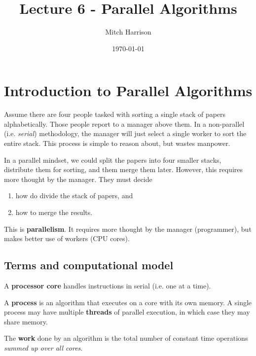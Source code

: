 \documentclass[titlepage, 12pt, leqno]{article}
\title{\Huge{Lecture 6 - Parallel Algorithms}}
\author{\large{Mitch Harrison}}
\date{\today}
\begin{document}
\setlength{\parskip}{1\baselineskip}
\setlength{\parindent}{15pt}
\maketitle
\tableofcontents
\newpage


\section{Introduction to Parallel Algorithms}

Assume there are four people tasked with sorting a single stack of papers
alphabetically. Those people report to a manager above them. In a non-parallel
(i.e. \textit{serial}) methodology, the manager will just select a single 
worker to sort the entire stack. This process is simple to reason about, but
wastes manpower.

In a parallel mindset, we could split the papers into four smaller stacks,
distribute them for sorting, and them merge them later. However, this requires
more thought by the manager. They must decide 
\begin{enumerate}
    \item how do divide the stack of papers, and
    \item how to merge the results.
\end{enumerate}

This is \textbf{parallelism}. It requires more thought by the manager
(programmer), but makes better use of workers (CPU cores).

\subsection{Terms and computational model}
\begin{definition}
    A \textbf{processor core} handles instructions in serial (i.e. one at a
    time).
\end{definition}

\begin{definition}
    A \textbf{process} is an algorithm that executes on a core with its own
    memory. A single process may have multiple \textbf{threads} of parallel
    execution, in which case they may share memory.
\end{definition}

\begin{definition}
    The \textbf{work} done by an algorithm is the total number of constant time
    operations \textit{summed up over all cores}.
\end{definition}
\end{document}
